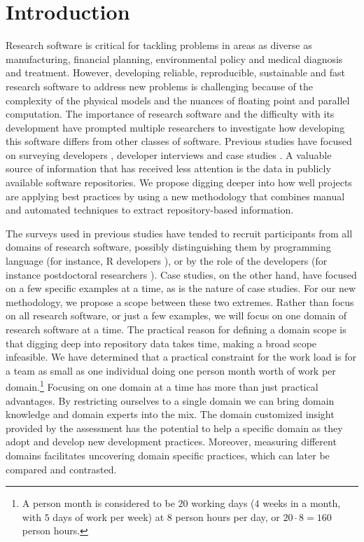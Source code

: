 \documentclass[runningheads]{llncs}
\begin{document}
\section{Introduction} \label{SecIntroduction}

Research software is critical for tackling problems in areas as diverse as
manufacturing, financial planning, environmental policy and medical diagnosis
and treatment.  However, developing reliable, reproducible, sustainable and fast
research software to address new problems is challenging because of the
complexity of the physical models and the nuances of floating point and parallel
computation. The importance of research software and the difficulty with its
development have prompted multiple researchers to investigate how developing
this software differs from other classes of software.  Previous studies have
focused on surveying developers
\cite{HannayEtAl2009,Nguyen-HoanEtAl2010,PintoEtAl2018}, developer interviews
\cite{SandersAndKelly2008} and case studies \cite{CarverEtAl2007,Segal2005}.  A
valuable source of information that has received less attention is the data in
publicly available software repositories.  We propose digging deeper into how
well projects are applying best practices by using a new methodology that
combines manual and automated techniques to extract repository-based
information.

The surveys used in previous studies have tended to recruit participants from
all domains of research software, possibly distinguishing them by programming
language (for instance, R developers \cite{PintoEtAl2018}), or by the role of
the developers (for instance postdoctoral researchers \cite{UditAndKatz2017}).
Case studies, on the other hand, have focused on a few specific examples at a
time, as is the nature of case studies.  For our new methodology, we propose a
scope between these two extremes.  Rather than focus on all research software,
or just a few examples, we will focus on one domain of research software at a
time. The practical reason for defining a domain scope is that digging deep into
repository data takes time, making a broad scope infeasible. We have determined
that a practical constraint for the work load is for a team as small as one
individual doing one person month worth of work per domain.\footnote{A person
month is considered to be $20$ working days ($4$ weeks in a month, with $5$ days
of work per week) at $8$ person hours per day, or $20 \cdot 8 = 160$ person
hours.} Focusing on one domain at a time has more than just practical
advantages.  By restricting ourselves to a single domain we can bring domain
knowledge and domain experts into the mix.  The domain customized insight
provided by the assessment has the potential to help a specific domain as they
adopt and develop new development practices.  Moreover, measuring different
domains facilitates uncovering domain specific practices, which can later be
compared and contrasted.
\end{document}
